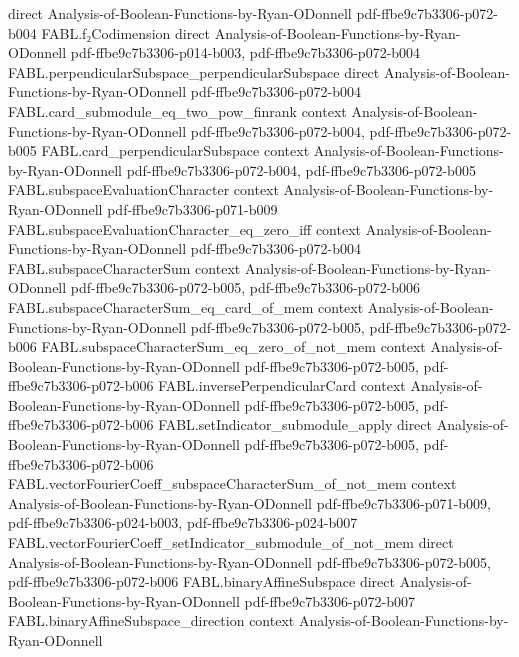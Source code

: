 \begin{theorem}
  {direct}
  {Analysis-of-Boolean-Functions-by-Ryan-ODonnell}
  {pdf-ffbe9c7b3306-p072-b004}
\proofstep
  {FABL.f₂Codimension}
  {direct}
  {Analysis-of-Boolean-Functions-by-Ryan-ODonnell}
  {pdf-ffbe9c7b3306-p014-b003,
    pdf-ffbe9c7b3306-p072-b004}
\proofstep
  {FABL.perpendicularSubspace_perpendicularSubspace}
  {direct}
  {Analysis-of-Boolean-Functions-by-Ryan-ODonnell}
  {pdf-ffbe9c7b3306-p072-b004}
\proofstep
  {FABL.card_submodule_eq_two_pow_finrank}
  {context}
  {Analysis-of-Boolean-Functions-by-Ryan-ODonnell}
  {pdf-ffbe9c7b3306-p072-b004,
    pdf-ffbe9c7b3306-p072-b005}
\proofstep
  {FABL.card_perpendicularSubspace}
  {context}
  {Analysis-of-Boolean-Functions-by-Ryan-ODonnell}
  {pdf-ffbe9c7b3306-p072-b004,
    pdf-ffbe9c7b3306-p072-b005}
\proofstep
  {FABL.subspaceEvaluationCharacter}
  {context}
  {Analysis-of-Boolean-Functions-by-Ryan-ODonnell}
  {pdf-ffbe9c7b3306-p071-b009}
\proofstep
  {FABL.subspaceEvaluationCharacter_eq_zero_iff}
  {context}
  {Analysis-of-Boolean-Functions-by-Ryan-ODonnell}
  {pdf-ffbe9c7b3306-p072-b004}
\proofstep
  {FABL.subspaceCharacterSum}
  {context}
  {Analysis-of-Boolean-Functions-by-Ryan-ODonnell}
  {pdf-ffbe9c7b3306-p072-b005,
    pdf-ffbe9c7b3306-p072-b006}
\proofstep
  {FABL.subspaceCharacterSum_eq_card_of_mem}
  {context}
  {Analysis-of-Boolean-Functions-by-Ryan-ODonnell}
  {pdf-ffbe9c7b3306-p072-b005,
    pdf-ffbe9c7b3306-p072-b006}
\proofstep
  {FABL.subspaceCharacterSum_eq_zero_of_not_mem}
  {context}
  {Analysis-of-Boolean-Functions-by-Ryan-ODonnell}
  {pdf-ffbe9c7b3306-p072-b005,
    pdf-ffbe9c7b3306-p072-b006}
\proofstep
  {FABL.inversePerpendicularCard}
  {context}
  {Analysis-of-Boolean-Functions-by-Ryan-ODonnell}
  {pdf-ffbe9c7b3306-p072-b005,
    pdf-ffbe9c7b3306-p072-b006}
\proofstep
  {FABL.setIndicator_submodule_apply}
  {direct}
  {Analysis-of-Boolean-Functions-by-Ryan-ODonnell}
  {pdf-ffbe9c7b3306-p072-b005,
    pdf-ffbe9c7b3306-p072-b006}
\proofstep
  {FABL.vectorFourierCoeff_subspaceCharacterSum_of_not_mem}
  {context}
  {Analysis-of-Boolean-Functions-by-Ryan-ODonnell}
  {pdf-ffbe9c7b3306-p071-b009,
    pdf-ffbe9c7b3306-p024-b003,
    pdf-ffbe9c7b3306-p024-b007}
\proofstep
  {FABL.vectorFourierCoeff_setIndicator_submodule_of_not_mem}
  {direct}
  {Analysis-of-Boolean-Functions-by-Ryan-ODonnell}
  {pdf-ffbe9c7b3306-p072-b005,
    pdf-ffbe9c7b3306-p072-b006}
\proofstep
  {FABL.binaryAffineSubspace}
  {direct}
  {Analysis-of-Boolean-Functions-by-Ryan-ODonnell}
  {pdf-ffbe9c7b3306-p072-b007}
\proofstep
  {FABL.binaryAffineSubspace_direction}
  {context}
  {Analysis-of-Boolean-Functions-by-Ryan-ODonnell}

\end{theorem}
